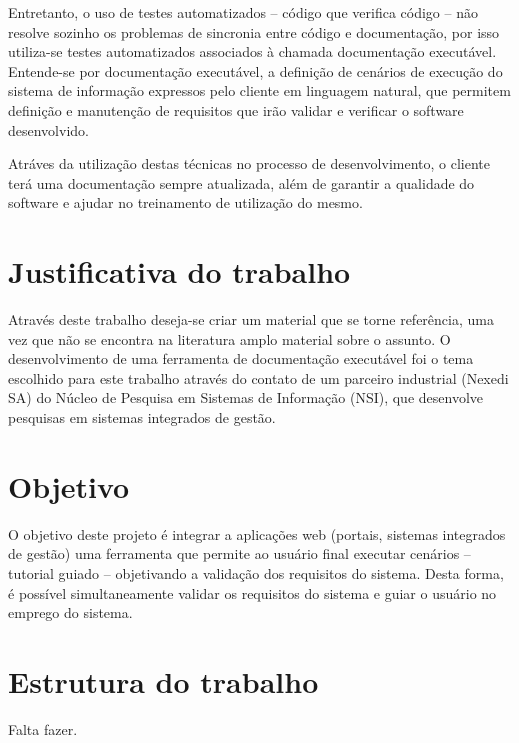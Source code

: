 Entretanto, o uso de testes automatizados – código que verifica código – não resolve sozinho os problemas de sincronia entre código e documentação, por isso utiliza-se testes automatizados associados à chamada documentação executável. Entende-se por documentação executável, a definição de cenários de execução do sistema de informação expressos pelo cliente em linguagem natural, que permitem definição e manutenção de requisitos que irão validar e verificar o software desenvolvido.

Atráves da utilização destas técnicas no processo de desenvolvimento, o cliente terá uma documentação sempre atualizada, além de garantir a qualidade do software e ajudar no treinamento de utilização do mesmo.

\section{Justificativa do trabalho}

Através deste trabalho deseja-se criar um material que se torne referência, uma vez que não se encontra na literatura amplo material sobre o assunto. O desenvolvimento de uma ferramenta de documentação executável foi o tema escolhido para este trabalho através do contato de um parceiro industrial (Nexedi SA) do Núcleo de Pesquisa em Sistemas de Informação (NSI), que desenvolve pesquisas em sistemas integrados de gestão.

\section{Objetivo}

O objetivo deste projeto é integrar a aplicações web (portais, sistemas integrados de gestão) uma ferramenta que permite ao usuário final executar cenários – tutorial guiado – objetivando a validação dos requisitos do sistema. Desta forma, é possível simultaneamente validar os requisitos do sistema e guiar o usuário no emprego do sistema.

\section{Estrutura do trabalho}
Falta fazer.
